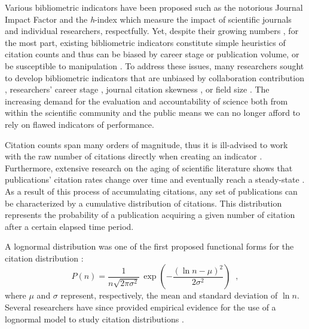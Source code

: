 Various bibliometric indicators have been proposed such as the notorious Journal Impact Factor \cite{Garfield1963} and the \textit{h}-index \cite{Hirsch2005} which measure the impact of scientific journals and individual researchers, respectfully. Yet, despite their growing numbers \cite{Egghe2006b,Jin2007a,Alonso2009a,Franceschini2010,Bharathi2013,Lando2014,Xu2015,Frittelli2016,Hutchins2016}, for the most part, existing bibliometric indicators constitute simple heuristics of citation counts and thus can be biased by career stage or publication volume, or be susceptible to manipulation \cite{MacRoberts1989, Narin1996, Cole2000, Glanzel2002, Borgman2002, Vinkler2004, Bornmann2007, Bornmann2008, Alonso2009, Castellano2009, Wilhite2012}. To address these issues, many researchers sought to develop bibliometric indicators that are unbiased by collaboration contribution \cite{Hirsch2010a,Stallings2013}, researchers' career stage \cite{Petersen2012}, journal citation skewness \cite{Stringer2008,Petersen2010,Yang2013}, or field size \cite{Radicchi2008,Kaur2013}. The increasing demand for the evaluation and accountability of science both from within the scientific community and the public \cite{Cronin1994a,Kostoff1997, Weingart2005a,Macilwain2010, Lane2011, Fortin2013} means we can no longer afford to rely on flawed indicators of performance.

Citation counts span many orders of magnitude, thus it is ill-advised to work with the raw number of citations directly when creating an indicator \cite{VanNoorden2014}. Furthermore, extensive research on the aging of scientific literature shows that publications' citation rates change over time and eventually reach a steady-state \cite{Egghe2000b,Pollman2000,Burrell2001,Aksnes2003,Bouabid2011,Petersen2014}. As a result of this process of accumulating citations, any set of publications can be characterized by a cumulative distribution of citations. This distribution represents the probability of a publication acquiring a given number of citation after a certain elapsed time period.

A lognormal distribution was one of the first proposed functional forms for the citation distribution \cite{Shockley1957}:
\begin{equation*}
P(n) = \frac{1}{n\sqrt{2 \pi \sigma^2}}\, \exp\left(-\frac{(\ln n - \mu)^2}{2\sigma^2}\right)\;\;,
\end{equation*}
where $\mu$ and $\sigma$ represent, respectively, the mean and standard deviation of $\ln n$. Several researchers have since provided empirical evidence for the use of a lognormal model to study citation distributions \cite{Egghe2001,Redner2005,Radicchi2008,Stringer2008,Radicchi2012,Wang2013a}.

